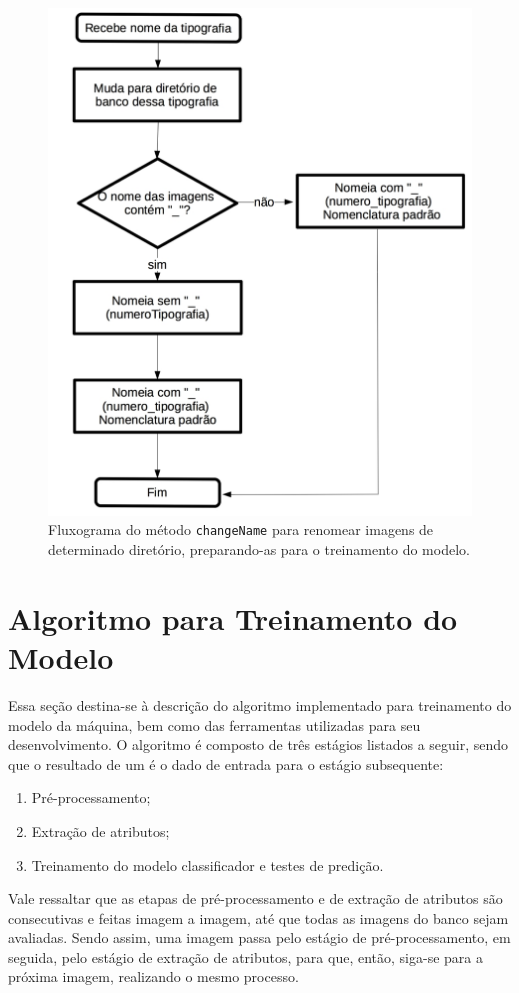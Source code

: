 \begin{figure}[H]
  \centering
  \includegraphics[width=0.55\linewidth]{figuras/changeName.pdf}
  \caption{Fluxograma do método \texttt{changeName} para renomear imagens de determinado diretório, preparando-as para o treinamento do modelo.}
  \label{fig:flowchangeName}
\end{figure}



\section{Algoritmo para Treinamento do Modelo}

Essa seção destina-se à descrição do algoritmo implementado para treinamento do modelo da máquina, bem como das ferramentas utilizadas para seu desenvolvimento. O algoritmo é composto de três estágios listados a seguir, sendo que o resultado de um é o dado de entrada para o estágio subsequente:

\begin{enumerate}
\item Pré-processamento;
\item Extração de atributos;
\item Treinamento do modelo classificador e testes de predição.
\end{enumerate}

Vale ressaltar que as etapas de pré-processamento e de extração de atributos são consecutivas e feitas imagem a imagem, até que todas as imagens do banco sejam avaliadas. Sendo assim, uma imagem passa pelo estágio de pré-processamento, em seguida, pelo estágio de extração de atributos, para que, então, siga-se para a próxima imagem, realizando o mesmo processo.

